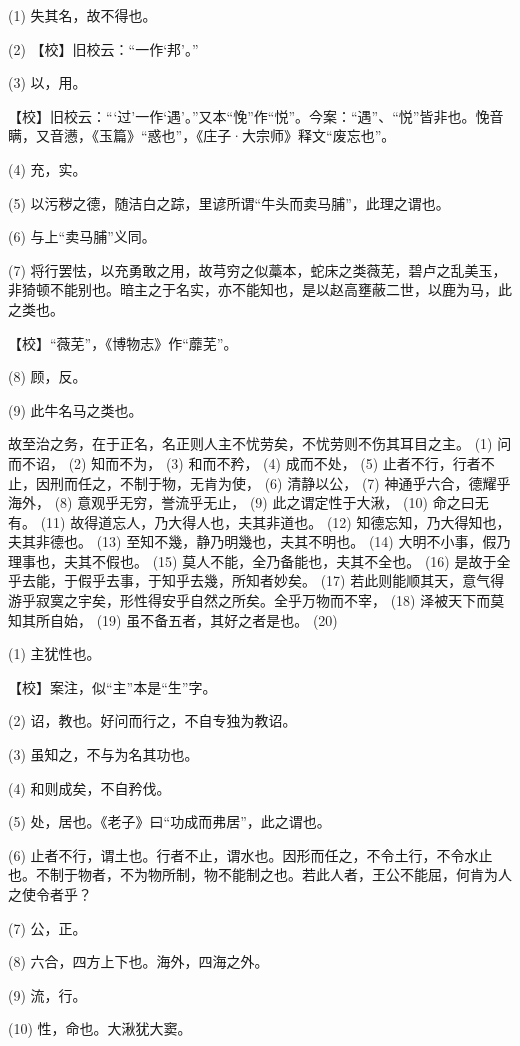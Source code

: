 \documentclass[12pt,UTF8]{ctexbook}
\begin{document}
(1) 失其名，故不得也。

(2) 【校】旧校云：“一作‘邦’。”

(3) 以，用。

【校】旧校云：“‘过’一作‘遇’。”又本“悗”作“悦”。今案：“遇”、“悦”皆非也。悗音瞒，又音懑，《玉篇》“惑也”，《庄子·大宗师》释文“废忘也”。

(4) 充，实。

(5) 以污秽之德，随洁白之踪，里谚所谓“牛头而卖马脯”，此理之谓也。

(6) 与上“卖马脯”义同。

(7) 将行罢怯，以充勇敢之用，故芎穷之似藁本，蛇床之类薇芜，碧卢之乱美玉，非猗顿不能别也。暗主之于名实，亦不能知也，是以赵高壅蔽二世，以鹿为马，此之类也。

【校】“薇芜”，《博物志》作“蘼芜”。

(8) 顾，反。

(9) 此牛名马之类也。

故至治之务，在于正名，名正则人主不忧劳矣，不忧劳则不伤其耳目之主。 (1) 问而不诏， (2) 知而不为， (3) 和而不矜， (4) 成而不处， (5) 止者不行，行者不止，因刑而任之，不制于物，无肯为使， (6) 清静以公， (7) 神通乎六合，德耀乎海外， (8) 意观乎无穷，誉流乎无止， (9) 此之谓定性于大湫， (10) 命之曰无有。 (11) 故得道忘人，乃大得人也，夫其非道也。 (12) 知德忘知，乃大得知也，夫其非德也。 (13) 至知不幾，静乃明幾也，夫其不明也。 (14) 大明不小事，假乃理事也，夫其不假也。 (15) 莫人不能，全乃备能也，夫其不全也。 (16) 是故于全乎去能，于假乎去事，于知乎去幾，所知者妙矣。 (17) 若此则能顺其天，意气得游乎寂寞之宇矣，形性得安乎自然之所矣。全乎万物而不宰， (18) 泽被天下而莫知其所自始， (19) 虽不备五者，其好之者是也。 (20)

(1) 主犹性也。

【校】案注，似“主”本是“生”字。

(2) 诏，教也。好问而行之，不自专独为教诏。

(3) 虽知之，不与为名其功也。

(4) 和则成矣，不自矜伐。

(5) 处，居也。《老子》曰“功成而弗居”，此之谓也。

(6) 止者不行，谓土也。行者不止，谓水也。因形而任之，不令土行，不令水止也。不制于物者，不为物所制，物不能制之也。若此人者，王公不能屈，何肯为人之使令者乎？

(7) 公，正。

(8) 六合，四方上下也。海外，四海之外。

(9) 流，行。

(10) 性，命也。大湫犹大窦。
\end{document}
